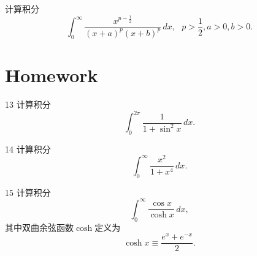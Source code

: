 \documentclass[CJK]{beamer}
\begin{document}
\begin{frame}
  \bch
  计算积分$$ \int_0^{\infty}\frac{x^{p-\frac{1}{2}}}{(x+a)^p(x+b)^p}\, dx,\ \ \ p>\frac{1}{2}, a>0, b>0.$$
  \ech
\end{frame}




\section{Homework}

\begin{frame}
  \bch
  \bitem
\item[13]{计算积分$$\int_0^{2\pi}\frac{1}{1+\sin^2x} \, dx.$$}
\item[14]{计算积分$$\int_0^\infty \frac{x^2}{1+x^4} \,dx.$$}
\item[15]{计算积分$$\int_0^\infty \frac{\cos x}{\cosh x} \,dx,$$ 其中双曲余弦函数$\cosh$定义为  $$\cosh x \equiv \frac{e^x+e^{-x}}{2}. $$}
  \eitem
  \ech
\end{frame}
\end{document}
